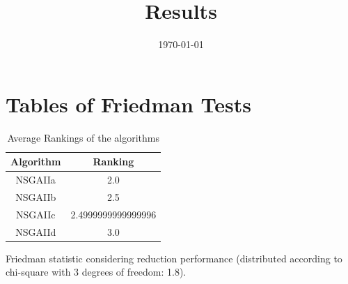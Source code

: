 \documentclass{article}
\title{Results}
\author{}
\date{\today}
\begin{document}
\oddsidemargin 0in \topmargin 0in\maketitle
\section{Tables of Friedman Tests}
\begin{table}[!htp]
\centering
\caption{Average Rankings of the algorithms
}\begin{tabular}{c|c}
Algorithm&Ranking\\
\hline
NSGAIIa&2.0\\
NSGAIIb&2.5\\
NSGAIIc&2.4999999999999996\\
NSGAIId&3.0\\
\end{tabular}
\end{table}


Friedman statistic considering reduction performance (distributed according to chi-square with 3 degrees of freedom: 1.8).
\end{document}
